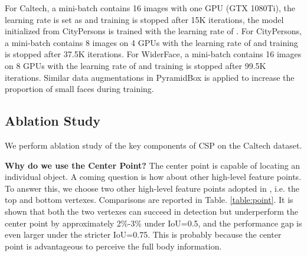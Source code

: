 \documentclass[review]{elsarticle}
\begin{document}
For Caltech, a mini-batch contains 16 images with one GPU (GTX 1080Ti), the learning rate is set as  and training is stopped after 15K iterations, the model initialized from CityPersons \cite{zhang2017citypersons} is trained with the learning rate of .
For CityPersons, a mini-batch contains 8 images on 4 GPUs with the learning rate of  and training is stopped after 37.5K iterations.
For WiderFace, a mini-batch contains 16 images on 8 GPUs with the learning rate of  and training is stopped after 99.5K iterations. Similar data augmentations in PyramidBox \cite{Tang_2018_ECCV} is applied to increase the proportion of small faces during training.

\subsection{Ablation Study}\label{sec:abl}
We perform ablation study of the key components of CSP on the Caltech dataset.

\textbf{Why do we use the Center Point?}
The center point is capable of locating an individual object. A coming question is how about other high-level feature points. To answer this, we choose two other high-level feature points adopted in \cite{Song_2018_ECCV}, i.e. the top and bottom vertexes. Comparisons are reported in Table. \ref{table:point}. It is shown that both the two vertexes can succeed in detection but underperform the center point by approximately 2\%-3\% under IoU=0.5, and the performance gap is even larger under the stricter IoU=0.75. This is probably because the center point is advantageous to perceive the full body information.
\end{document}

